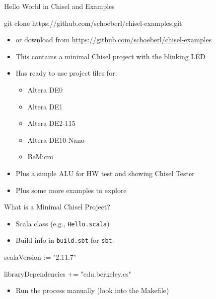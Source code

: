 \documentclass[xcolor=pdflatex,dvipsnames,table]{beamer}
\newcommand{\code}[1]{{\texttt{#1}}}
\begin{document}
\begin{frame}[fragile]{Hello World in Chisel and Examples}
\begin{chisel}
git clone https://github.com/schoeberl/chisel-examples.git
\end{chisel}
\begin{itemize}
\item or download from \url{https://github.com/schoeberl/chisel-examples}
\item This contains a minimal Chisel project with the blinking LED
\item Has ready to use project files for:
\begin{itemize}
\item Altera DE0
\item Altera DE1
\item Altera DE2-115
\item Altera DE10-Nano
\item BeMicro
\end{itemize}
\item Plus a simple ALU for HW test and showing Chisel Tester
\item Plus some more examples to explore
\end{itemize}
\end{frame}

\begin{frame}[fragile]{What is a Minimal Chisel Project?}
\begin{itemize}
\item Scala class (e.g., \code{Hello.scala})
\item Build info in \code{build.sbt} for \code{sbt}:
\end{itemize}
\begin{chisel}
scalaVersion := "2.11.7"

libraryDependencies += "edu.berkeley.cs" %
\end{chisel}
\begin{itemize}
\item Run the process manually (look into the Makefile)
\end{itemize}
\end{frame}
\end{document}
